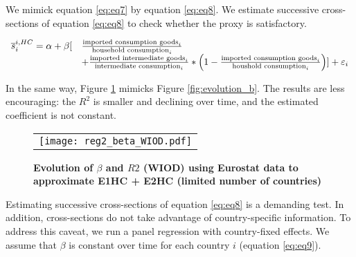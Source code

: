 \documentclass[11pt,a4paper]{article}
\begin{document}
We mimick equation \ref{eq:eq7} by equation \ref{eq:eq8}. 
We estimate successive cross-sections of equation \ref{eq:eq8} to check whether the proxy is satisfactory. 

 \begin{equation}
 \begin{array}{llll}
\overline{s}_{i}^{i,HC}= \alpha +  \beta  [&\frac{\textnormal{imported consumption goods}_i}{\textnormal{household consumption}_i} \\ & + \frac{\textnormal{imported intermediate goods}_i}{\textnormal{intermediate consumption}_i}*\left(1-\frac{\textnormal{imported consumption goods}_i}{\textnormal{houshold consumption}_i}\right)] +\varepsilon_i 
\end{array}
\label{eq:eq8}
\end{equation}


In the same way, Figure \ref{fig:evolution_b_reg2} mimicks Figure \ref{fig:evolution_b}. 
The results are less encouraging: the $R^2$ is smaller and declining over time, and the estimated coefficient is not constant.


\begin{figure}[!h]
	\centering
	\caption{\footnotesize{\textbf{Evolution of $\beta$ and $R2$ (WIOD) using Eurostat data to approximate E1HC + E2HC (limited number of countries)}}}
	\begin{tabular}{c}
		\texttt{[image: reg2\_beta\_WIOD.pdf]}\\
	\end{tabular}
	\label{fig:evolution_b_reg2}
\end{figure}

Estimating successive cross-sections of equation \ref{eq:eq8} is a demanding test. 
In addition, cross-sections do not take advantage of country-specific information.
To address this caveat, we run a panel regression with country-fixed effects.
We assume that $\beta$ is constant over time for each country $i$ (equation \ref{eq:eq9}).
\end{document}
